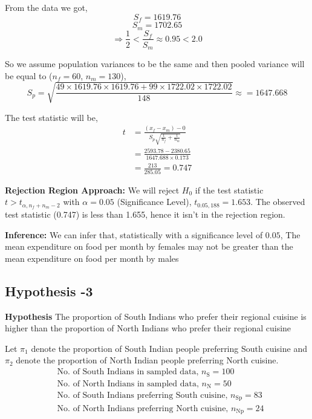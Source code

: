 \documentclass[12pt]{article}
\begin{document}
    From the data we got,
    \[ S_f = 1619.76 \]
    \[ S_m = 1702.65 \]
    \[ \Rightarrow \frac{1}{2} < \frac{S_f}{S_m} \approx 0.95 < 2.0 \]
    
    So we assume population variances to be the same and then pooled variance will be equal to ($n_f = 60$, $n_m = 130$),
    \begin{equation}
        S_p = \sqrt{\frac{ 49 \times  1619.76\times 1619.76 + 99 \times 1722.02 \times 1722.02}{148}} \approx  = 1647.668
    \end{equation}

    The test statistic will be,
    \begin{align}
        t &= \frac{(x_f - x_m) - 0}{S_p \sqrt{\frac{1}{n_f} + \frac{1}{n_m}}} \\
        &= \frac{2593.78 - 2380.65}{1647.688 \times 0.173} \\
        &= \frac{213}{285.05} = 0.747
    \end{align}

    \textbf{Rejection Region Approach:}
We will reject \( H_0 \) if the test statistic \( t > t_{\alpha,n_f+n_m-2} \) with \( \alpha = 0.05 \) (Significance Level),
\( t_{0.05,188} = 1.653 \).
The observed test statistic (0.747) is less than 1.655, hence it isn't in the rejection region.

 \textbf{Inference:} We can infer that, statistically with a significance level of $0.05$, The mean expenditure on food per month by females may not be greater than the mean expenditure on food per month by males

    \subsection{Hypothesis -3}
         \textbf{Hypothesis}
       The proportion of South Indians who prefer their regional cuisine is higher than the proportion of North Indians who prefer their regional cuisine
       \medskip
   
    Let $\pi_1$ denote the proportion of South Indian people preferring South cuisine and $\pi_2$ denote the proportion of North Indian people preferring North cuisine.
    \begin{align}
        &\text{No. of South Indians in sampled data, } n_{\text{S}} = 100 \\
        &\text{No. of North Indians in sampled data, } n_{\text{N}} = 50 \\
        &\text{No. of South Indians preferring South cuisine, } n_{\text{Sp}} = 83 \\
        &\text{No. of North Indians preferring North cuisine, } n_{\text{Np}} = 24
    \end{align}
    
\end{document}
